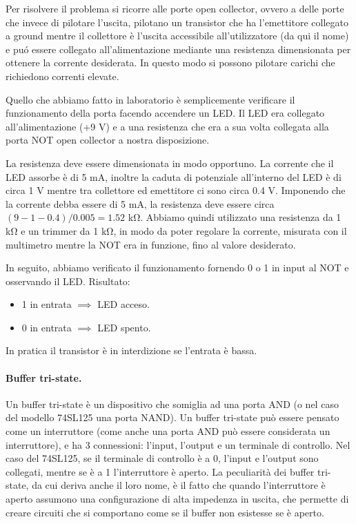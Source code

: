 Per risolvere il problema si ricorre alle porte open collector, ovvero a delle porte
che invece di pilotare l'uscita, pilotano un transistor che ha l'emettitore
collegato a ground mentre il collettore è l'uscita accessibile all'utilizzatore (da qui il nome)
e puó essere collegato all'alimentazione mediante una resistenza dimensionata per
ottenere la corrente desiderata. In questo modo si possono pilotare carichi che richiedono
correnti elevate.

Quello che abbiamo fatto in laboratorio è semplicemente verificare il funzionamento
della porta facendo accendere un LED. Il LED era collegato all'alimentazione (+9 V) e
a una resistenza che era a sua volta collegata alla porta NOT open collector a nostra disposizione.

La resistenza deve essere dimensionata in modo opportuno. La corrente che il LED assorbe è di 5 mA,
inoltre la caduta di potenziale all'interno del LED è di circa 1 V mentre tra collettore
ed emettitore ci sono circa 0.4 V. Imponendo che la corrente debba essere di 5 mA, la resistenza deve essere
circa $(9-1-0.4)/0.005 = 1.52$ \si{\kilo\ohm}. Abbiamo quindi utilizzato una resistenza da 1 \si{\kilo\ohm}
e un trimmer da 1 \si{\kilo\ohm}, in modo da poter regolare la corrente, misurata con il multimetro
mentre la NOT era in funzione, fino al valore desiderato.

In seguito, abbiamo verificato il funzionamento fornendo 0 o 1 in input al NOT e osservando il LED.
Risultato:

\begin{itemize}
    \item{1 in entrata $\implies$ LED acceso.}
    \item{0 in entrata $\implies$ LED spento.}
\end{itemize}

In pratica il transistor è in interdizione se l'entrata è bassa.

\paragraph{Buffer tri-state.}

Un buffer tri-state è un dispositivo che somiglia ad una porta AND (o nel caso del modello 74SL125 una porta NAND).
Un buffer tri-state può essere pensato come un interruttore (come anche una porta AND può essere
considerata un interruttore), e ha 3 connessioni: l'input, l'output e un terminale di controllo.
Nel caso del 74SL125, se il terminale di controllo è a 0, l'input e l'output sono collegati, mentre se è a 1
l'interruttore è aperto. La peculiarità dei buffer tri-state, da cui deriva anche il loro nome, è il fatto
che quando l'interruttore è aperto assumono una configurazione di alta impedenza in uscita, che permette
di creare circuiti che si comportano come se il buffer non esistesse se è aperto.

